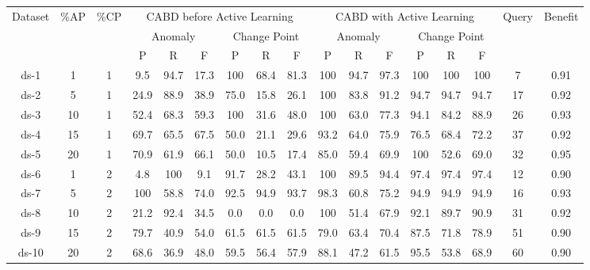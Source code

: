 \begin{table*}[h]
	\centering
	\setlength\tabcolsep{1.5pt}
	\begin{tabular}{|c|c|c|c|c|c|c|c|c|c|c|c|c|c|c|c|c|}
		\toprule
		\multirow{3}[6]{*}{Dataset} & \multirow{3}[6]{*}{\%AP} & \multirow{3}[6]{*}{\%CP} & \multicolumn{6}{c|}{CABD before Active Learning} & \multicolumn{6}{c|}{CABD with Active Learning} & \multirow{3}[6]{*}{Query} & \multirow{3}[6]{*}{Benefit} \\
		\cmidrule{4-15}          &       &       & \multicolumn{3}{c|}{Anomaly} & \multicolumn{3}{c|}{Change Point} & \multicolumn{3}{c|}{Anomaly} & \multicolumn{3}{c|}{Change Point} &       &  \\
		\cmidrule{4-15}          &       &       & P     & R     & F     & P     & R     & F     & P     & R     & F     & P     & R     & F     &       &  \\
		\midrule
		ds-1  & 1     & 1     & 9.5   & 94.7  & 17.3  & 100 & 68.4  & 81.3  & 100 & 94.7  & 97.3  & 100 & 100 & 100 & 7     & 0.91 \\
		\midrule
		ds-2  & 5     & 1     & 24.9  & 88.9  & 38.9  & 75.0  & 15.8  & 26.1  & 100 & 83.8  & 91.2  & 94.7  & 94.7  & 94.7  & 17    & 0.92 \\
		\midrule
		ds-3  & 10    & 1     & 52.4  & 68.3  & 59.3  & 100 & 31.6  & 48.0  & 100 & 63.0  & 77.3  & 94.1  & 84.2  & 88.9  & 26    & 0.93 \\
		\midrule
		ds-4  & 15    & 1     & 69.7  & 65.5  & 67.5  & 50.0  & 21.1  & 29.6  & 93.2  & 64.0  & 75.9  & 76.5  & 68.4  & 72.2  & 37    & 0.92 \\
		\midrule
		ds-5  & 20    & 1     & 70.9  & 61.9  & 66.1  & 50.0  & 10.5  & 17.4  & 85.0  & 59.4  & 69.9  & 100 & 52.6  & 69.0  & 32    & 0.95 \\
		\midrule
		ds-6  & 1     & 2     & 4.8   & 100 & 9.1   & 91.7  & 28.2  & 43.1  & 100 & 89.5  & 94.4  & 97.4  & 97.4  & 97.4  & 12    & 0.90 \\
		\midrule
		ds-7  & 5     & 2     & 100 & 58.8  & 74.0  & 92.5  & 94.9  & 93.7  & 98.3  & 60.8  & 75.2  & 94.9  & 94.9  & 94.9  & 16    & 0.93 \\
		\midrule
		ds-8  & 10    & 2     & 21.2  & 92.4  & 34.5  & 0.0   & 0.0   & 0.0   & 100 & 51.4  & 67.9  & 92.1  & 89.7  & 90.9  & 31    & 0.92 \\
		\midrule
		ds-9  & 15    & 2     & 79.7  & 40.9  & 54.0  & 61.5  & 61.5  & 61.5  & 79.0  & 63.4  & 70.4  & 87.5  & 71.8  & 78.9  & 51    & 0.90 \\
		\midrule
		ds-10 & 20    & 2     & 68.6  & 36.9  & 48.0  & 59.5  & 56.4  & 57.9  & 88.1  & 47.2  & 61.5  & 95.5  & 53.8  & 68.9  & 60    & 0.90 \\

\end{tabular}
\end{table*}
